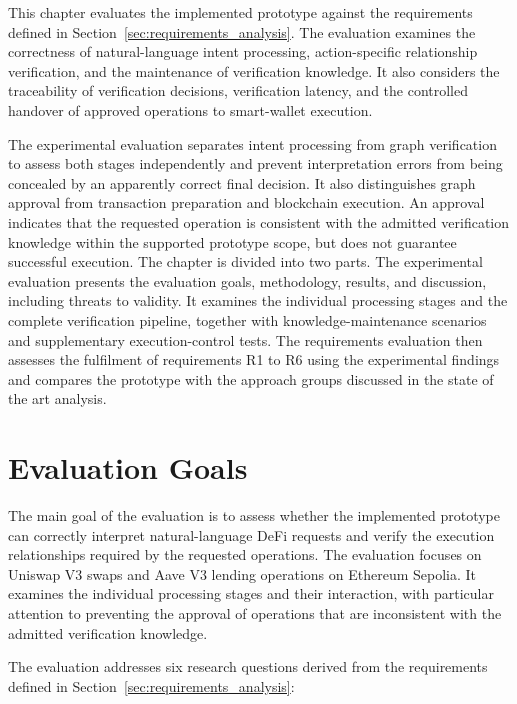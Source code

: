 
This chapter evaluates the implemented prototype against the requirements
defined in Section~\ref{sec:requirements_analysis}. The evaluation
examines the correctness of natural-language intent processing,
action-specific relationship verification, and the maintenance of
verification knowledge. It also considers the traceability of
verification decisions, verification latency, and the controlled
handover of approved operations to smart-wallet execution.

The experimental evaluation separates intent processing from graph
verification to assess both stages independently and prevent
interpretation errors from being concealed by an apparently correct
final decision. It also distinguishes graph approval from transaction
preparation and blockchain execution. An approval indicates that the
requested operation is consistent with the admitted verification
knowledge within the supported prototype scope, but does not
guarantee successful execution. The chapter is divided into two parts. The experimental evaluation
presents the evaluation goals, methodology, results, and discussion,
including threats to validity. It examines the individual processing
stages and the complete verification pipeline, together with
knowledge-maintenance scenarios and supplementary execution-control
tests. The requirements evaluation then assesses the fulfilment of
requirements R1 to R6 using the experimental findings and compares the
prototype with the approach groups discussed in the state of the art
analysis.



\section{Evaluation Goals}
\label{sec:evaluation_goals}

The main goal of the evaluation is to assess whether the implemented
prototype can correctly interpret natural-language DeFi requests and
verify the execution relationships required by the requested operations.
The evaluation focuses on Uniswap V3 swaps and Aave V3 lending operations
on Ethereum Sepolia. It examines the individual processing stages and
their interaction, with particular attention to preventing the approval
of operations that are inconsistent with the admitted verification
knowledge.

The evaluation addresses six research questions derived from the
requirements defined in Section~\ref{sec:requirements_analysis}:

